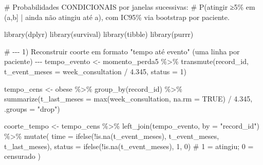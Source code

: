 \documentclass[
]{article}
\newenvironment{Shaded}{\begin{snugshade}}{\end{snugshade}}
\newcommand{\AttributeTok}[1]{\textcolor[rgb]{0.40,0.45,0.13}{#1}}
\newcommand{\CommentTok}[1]{\textcolor[rgb]{0.37,0.37,0.37}{#1}}
\newcommand{\ConstantTok}[1]{\textcolor[rgb]{0.56,0.35,0.01}{#1}}
\newcommand{\DecValTok}[1]{\textcolor[rgb]{0.68,0.00,0.00}{#1}}
\newcommand{\FloatTok}[1]{\textcolor[rgb]{0.68,0.00,0.00}{#1}}
\newcommand{\FunctionTok}[1]{\textcolor[rgb]{0.28,0.35,0.67}{#1}}
\newcommand{\NormalTok}[1]{\textcolor[rgb]{0.00,0.23,0.31}{#1}}
\newcommand{\OtherTok}[1]{\textcolor[rgb]{0.00,0.23,0.31}{#1}}
\newcommand{\SpecialCharTok}[1]{\textcolor[rgb]{0.37,0.37,0.37}{#1}}
\newcommand{\StringTok}[1]{\textcolor[rgb]{0.13,0.47,0.30}{#1}}
\begin{document}
\begin{Shaded}
\begin{Highlighting}[]
\CommentTok{\# Probabilidades CONDICIONAIS por janelas sucessivas:}
\CommentTok{\# P(atingir ≥5\% em (a,b] | ainda não atingiu até a), com IC95\% via bootstrap por paciente.}

\FunctionTok{library}\NormalTok{(dplyr)}
\FunctionTok{library}\NormalTok{(survival)}
\FunctionTok{library}\NormalTok{(tibble)}
\FunctionTok{library}\NormalTok{(purrr)}

\CommentTok{\# {-}{-}{-} 1) Reconstruir coorte em formato "tempo até evento" (uma linha por paciente) {-}{-}{-}}
\NormalTok{tempo\_evento }\OtherTok{\textless{}{-}}\NormalTok{ momento\_perda5 }\SpecialCharTok{\%\textgreater{}\%}
  \FunctionTok{transmute}\NormalTok{(record\_id, }\AttributeTok{t\_event\_meses =}\NormalTok{ week\_consultation }\SpecialCharTok{/} \FloatTok{4.345}\NormalTok{, }\AttributeTok{status =} \DecValTok{1}\NormalTok{)}

\NormalTok{tempo\_cens }\OtherTok{\textless{}{-}}\NormalTok{ obese }\SpecialCharTok{\%\textgreater{}\%}
  \FunctionTok{group\_by}\NormalTok{(record\_id) }\SpecialCharTok{\%\textgreater{}\%}
  \FunctionTok{summarize}\NormalTok{(}\AttributeTok{t\_last\_meses =} \FunctionTok{max}\NormalTok{(week\_consultation, }\AttributeTok{na.rm =} \ConstantTok{TRUE}\NormalTok{) }\SpecialCharTok{/} \FloatTok{4.345}\NormalTok{, }\AttributeTok{.groups =} \StringTok{"drop"}\NormalTok{)}

\NormalTok{coorte\_tempo }\OtherTok{\textless{}{-}}\NormalTok{ tempo\_cens }\SpecialCharTok{\%\textgreater{}\%}
  \FunctionTok{left\_join}\NormalTok{(tempo\_evento, }\AttributeTok{by =} \StringTok{"record\_id"}\NormalTok{) }\SpecialCharTok{\%\textgreater{}\%}
  \FunctionTok{mutate}\NormalTok{(}
    \AttributeTok{time   =} \FunctionTok{ifelse}\NormalTok{(}\SpecialCharTok{!}\FunctionTok{is.na}\NormalTok{(t\_event\_meses), t\_event\_meses, t\_last\_meses),}
    \AttributeTok{status =} \FunctionTok{ifelse}\NormalTok{(}\SpecialCharTok{!}\FunctionTok{is.na}\NormalTok{(t\_event\_meses), }\DecValTok{1}\NormalTok{, }\DecValTok{0}\NormalTok{)  }\CommentTok{\# 1 = atingiu; 0 = censurado}
\NormalTok{  )}


\end{Highlighting}
\end{Shaded}
\end{document}
